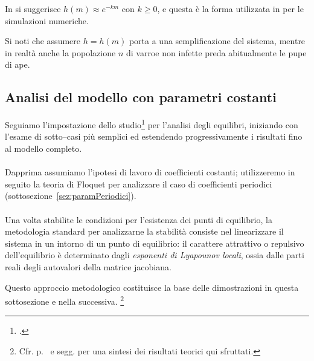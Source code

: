In \cite{sumMar04} si suggerisce $h(m) \approx e^{-km}$ con $k\geq0$, e questa è la forma utilizzata in \cite{ratti2017} per le simulazioni numeriche.

Si noti che assumere $h=h(m)$ porta a una semplificazione del sistema, mentre in realtà anche la
popolazione $n$ di varroe non infette preda abitualmente le pupe di ape.


\subsection{Analisi del modello con parametri costanti}
Seguiamo l'impostazione dello studio\footcite{ratti2017} per l'analisi degli equilibri, iniziando con l'esame
di sotto--casi più semplici ed estendendo progressivamente i risultati fino al modello completo.

\paragraph{}
Dapprima assumiamo l'ipotesi di lavoro di coefficienti costanti; utilizzeremo in seguito la teoria di Floquet per analizzare il caso di coefficienti periodici (sottosezione~\ref{sez:paramPeriodici}).

\paragraph{}
Una volta stabilite le condizioni per l'esistenza dei punti di equilibrio, la metodologia standard per analizzarne la stabilità consiste nel linearizzare il sistema in un intorno di un punto di equilibrio: il carattere attrattivo o repulsivo dell'equilibrio è determinato dagli \emph{esponenti di Lyapounov locali}, ossia dalle parti reali degli autovalori della matrice jacobiana.

Questo approccio metodologico costituisce la base delle dimostrazioni in questa sottosezione e nella successiva.
\footnote{Cfr. p.~\pageref{chap:teoria} e segg. per una sintesi dei risultati teorici qui sfruttati.}

